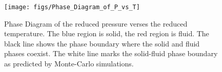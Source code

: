 \documentclass[double,12pt]{beavtex}
\begin{document}
\begin{figure}
  \centering
  \texttt{[image: figs/Phase\_Diagram\_of\_P\_vs\_T]}
  \caption{Phase Diagram of the reduced pressure verses the reduced 
  temperature. The blue region is solid, the red region is fluid.
  The black line shows the phase boundary where the solid and fluid
  phases coexist. The white line marks the solid-fluid phase boundary  
  as predicted by Monte-Carlo simulations.}
  \label{fig:Phase_Diagram_P_vs_T}
\end{figure}
%
%
%
\begin{figure}
  \centering
  \label{fig:Phase_Diagram_P_vs_T_AS}
\end{figure}
%
%
\begin{figure}
  \centering
  \label{fig:p-vs-T_at_fixed_density}
\end{figure}
\end{document}
